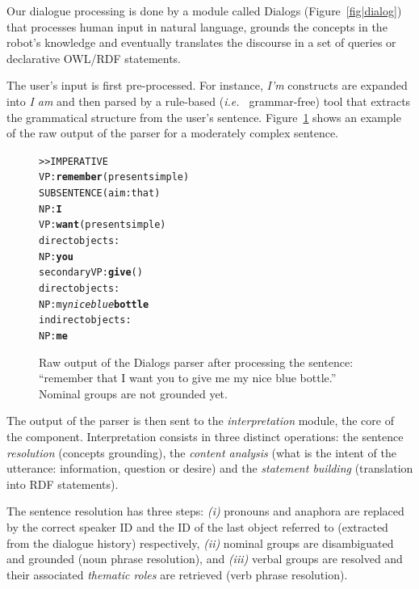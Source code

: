 \documentclass{svmult}
\newcommand{\ie}{{\textit{i.e.~}}}
\begin{document}
Our dialogue processing is done by a module called {\sc Dialogs} (Figure~\ref{fig|dialog}) that processes human
input in natural language, grounds the concepts in the robot's knowledge and
eventually translates the discourse in a set of queries or declarative OWL/RDF
statements.  

The user's input is first pre-processed. For instance, \emph{I'm} constructs are expanded
into \emph{I am} and then parsed by a rule-based (\ie
grammar-free) tool that extracts the grammatical structure from the user's
sentence. Figure~\ref{dialog|parser_output} shows an example of the raw output of the parser for a moderately complex sentence.

\begin{figure}%
\begin{center}
\scriptsize
\begin{alltt}
>> IMPERATIVE
VP: \textbf{remember} (present simple)
    SUBSENTENCE (aim: that)
      NP: \textbf{I}
      VP: \textbf{want} (present simple)
        direct objects: 
          NP: \textbf{you}
        secondary VP: \textbf{give} ()
              direct objects:
                NP: my \emph{nice blue} \textbf{bottle}
              indirect objects:
                NP: \textbf{me}
\end{alltt}
\end{center}
\caption{Raw output of the {\sc Dialogs} parser after processing the
sentence: ``remember that I want you to give me my nice blue bottle.'' 
Nominal groups are not grounded yet.} 
\label{dialog|parser_output}
\end{figure}

The output of the parser is then sent to the \emph{interpretation} module, the
core of the component.  Interpretation consists in three distinct operations:
the sentence \emph{resolution} (concepts grounding), the \emph{content
analysis} (what is the intent of the utterance: information, question or
desire) and the \emph{statement building} (translation into RDF statements).

The sentence resolution has three steps: {\it(i)} pronouns and anaphora are
replaced by the correct speaker ID and the ID of the last object referred to
(extracted from the dialogue history) respectively, {\it(ii)} nominal groups are
disambiguated and grounded (noun phrase resolution), and {\it(iii)}
verbal groups are resolved and their associated \emph{thematic roles} are
retrieved (verb phrase resolution).
\end{document}
